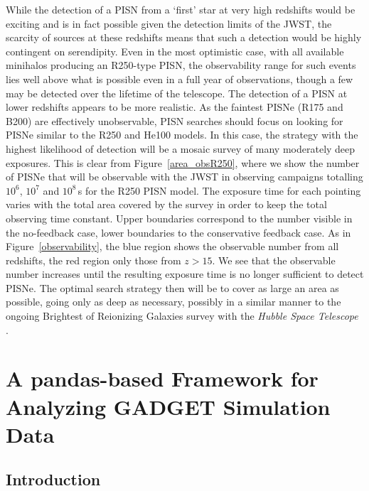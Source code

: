 \documentclass{thesis}
\newcommand{\RefFig}[1]{\mbox{Figure~\ref{#1}}}
\begin{document}
While the detection of a PISN from a `first' star at very high
redshifts would be exciting and is in fact possible given the
detection limits of the JWST, the scarcity of sources at these
redshifts means that such a detection would be highly contingent on
serendipity. Even in the most optimistic case, with all available
minihalos producing an R250-type PISN, the observability range for
such events lies well above what is possible even in a full year of
observations, though a few may be detected over the lifetime of the
telescope.  The detection of a PISN at lower redshifts appears to be
more realistic.  As the faintest PISNe (R175 and B200) are effectively
unobservable, PISN searches should focus on looking for PISNe similar
to the R250 and He100 models.  In this case, the strategy with the
highest likelihood of detection will be a mosaic survey of many
moderately deep exposures.  This is clear from \RefFig{area_obsR250},
where we show the number of PISNe that will be observable with the
JWST in observing campaigns totalling $10^6$, $10^7$ and $10^8\,$s for
the R250 PISN model. The exposure time for each pointing varies with
the total area covered by the survey in order to keep the total
observing time constant.  Upper boundaries correspond to the number
visible in the no-feedback case, lower boundaries to the conservative
feedback case. As in \RefFig{observability}, the blue region shows the
observable number from all redshifts, the red region only those from
$z>15$.  We see that the observable number increases until the
resulting exposure time is no longer sufficient to detect PISNe.  The
optimal search strategy then will be to cover as large an area as
possible, going only as deep as necessary, possibly in a similar
manner to the ongoing Brightest of Reionizing Galaxies survey with the
\textit{Hubble Space Telescope} \citep{Trentietal2011, Bradleyetal2012}.

\chapter{A pandas-based Framework for Analyzing GADGET Simulation Data}

\section{Introduction}
\label{sec:intro}
\end{document}
